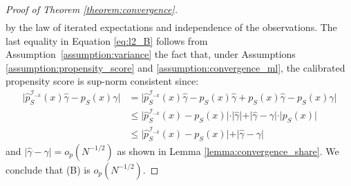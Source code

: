 \begin{appendix}
\begin{proof}[Proof of Theorem \ref{theorem:convergence}]
\begin{align*}
    \end{align*}
    by the law of iterated expectations and independence of the observations.
    The last equality in Equation \eqref{eq:l2_B} follows from Assumption~\ref{assumption:variance} the fact that, under Assumptions \ref{assumption:propensity_score} and \ref{assumption:convergence_ml}, the calibrated propensity score is sup-norm consistent since:
    \begin{align*}
        \vert \widehat{p}^{\mathcal{I}_{-k}}_S(x) \widehat{\gamma} - p_S(x)\gamma  \vert &= \vert \widehat{p}^{\mathcal{I}_{-k}}_S(x) \widehat{\gamma} - p_S(x)\widehat{\gamma} + p_S(x)\widehat{\gamma} - p_S(x)\gamma \vert\\
        & \leq  \vert \widehat{p}^{\mathcal{I}_{-k}}_S(x) - p_S(x) \vert \cdot \vert \widehat{\gamma} \vert + \vert \widehat{\gamma} -\gamma \vert\cdot \vert p_S(x) \vert \\
        & \leq \vert \widehat{p}^{\mathcal{I}_{-k}}_S(x) - p_S(x) \vert + \vert \widehat{\gamma} -\gamma \vert
    \end{align*}
    and $\vert \widehat{\gamma} -\gamma \vert = o_p(N^{-1/2})$ as shown in Lemma \ref{lemma:convergence_share}. We conclude that (B) is $o_p(N^{-1/2})$.\par


\end{proof}
\end{appendix}
